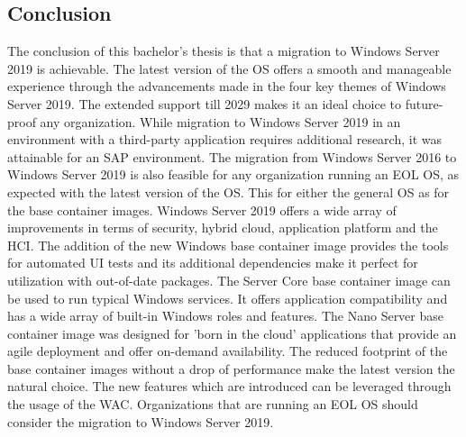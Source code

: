 \documentclass[a0,portrait]{a0poster}
\begin{document}
\begin{multicols}{2}
\section*{Conclusion}
\color{black}
The conclusion of this bachelor's thesis is that a migration to Windows Server 2019 is achievable.
The latest version of the OS offers a smooth and manageable experience through the advancements made in the four key themes of Windows Server 2019. 
The extended support till 2029 makes it an ideal choice to future-proof any organization. 
While migration to Windows Server 2019 in an environment with a third-party application requires additional research, it was attainable for an SAP environment. 
The migration from Windows Server 2016 to Windows Server 2019 is also feasible for any organization running an EOL OS, as expected with the latest version of the OS.
This for either the general OS as for the base container images.
Windows Server 2019 offers a wide array of improvements in terms of security, hybrid cloud, application platform and the HCI.
The addition of the new Windows base container image provides the tools for automated UI tests and its additional dependencies make it perfect for utilization with out-of-date packages. 
The Server Core base container image can be used to run typical Windows services. 
It offers application compatibility and has a wide array of built-in Windows roles and features. 
The Nano Server base container image was designed for 'born in the cloud' applications that provide an agile deployment and offer on-demand availability. 
The reduced footprint of the base container images without a drop of performance make the latest version the natural choice. 
The new features which are introduced can be leveraged through the usage of the WAC.
Organizations that are running an EOL OS should consider the migration to Windows Server 2019.
\color{HoGentAccent1} 

\end{multicols}
\end{document}
